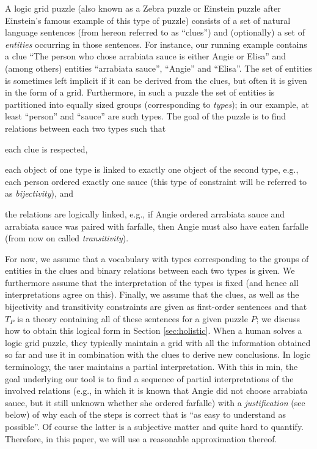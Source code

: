 A logic grid puzzle  (also known as a Zebra puzzle or Einstein puzzle after Einstein's famous example of this type of puzzle) consists of a set of natural language sentences (from hereon referred to as ``clues'') and (optionally) a set of \emph{entities} occurring in those sentences. 
For instance, our running example contains a clue ``The person who chose arrabiata sauce is either Angie or Elisa'' and (among others) entities ``arrabiata sauce'', ``Angie'' and ``Elisa''. 
The set of entities is sometimes left implicit if it can be derived from the clues, but often it is given in the form of a grid. 
Furthermore, in such a puzzle the set of entities is partitioned into equally sized groups (corresponding to \emph{types}); in our example, at least ``person'' and ``sauce'' are such types. 
The goal of the puzzle is to find relations between each two types such that
\begin{compactitem}
	\item each clue is respected, 
	\item each object of one type is linked to exactly one object of the second type, e.g., each person ordered exactly one sauce (this type of constraint will be referred to as \emph{bijectivity}), and 
	\item the relations are logically linked, e.g., if Angie ordered arrabiata sauce and arrabiata sauce was paired with farfalle, then Angie must also have eaten farfalle (from now on called \emph{transitivity}). 
\end{compactitem}

For now, we assume that a vocabulary with types corresponding to the groups of entities in the clues and binary relations between each two types is given.
We furthermore assume that the interpretation of the types is fixed (and hence all interpretations agree on this). 
Finally, we assume that the clues, as well as the bijectivity and transitivity constraints are given as first-order sentences and that $T_P$ is a theory containing all of these sentences for a given puzzle $P$; we discuss how to obtain this logical form in Section \ref{sec:holistic}.
When a human solves a logic grid puzzle, they typically maintain a grid with all the information obtained so far and use it in combination with the clues to derive new conclusions. In logic terminology, the user maintains a partial interpretation.  
With this in min, the goal underlying our tool is to find a sequence of partial interpretations of the involved relations (e.g., in which it is known that Angie did not choose arrabiata sauce, but it still unknown whether she ordered farfalle) with a 
\emph{justification} (see below) of why each of the steps is correct that is ``as easy to understand as possible''. 
Of course the latter is a subjective matter and quite hard to quantify. Therefore, in this paper, we will use a reasonable approximation thereof. 


